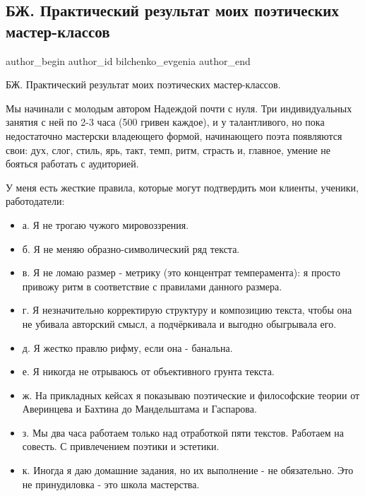  
 
 
 
 
 
\subsection{БЖ. Практический результат моих поэтических мастер-классов}
\label{sec:10_06_2021.fb.bilchenko_evgenia.1.masterklassy_rezultat}
\ifcmt
 author_begin
   author_id bilchenko_evgenia
 author_end
\fi

БЖ. Практический результат моих поэтических мастер-классов.

Мы начинали с молодым автором Надеждой почти с нуля. Три индивидуальных занятия
с ней по 2-3 часа (500 гривен каждое), и у талантливого, но пока недостаточно
мастерски владеющего формой, начинающего поэта появляются свои: дух, слог,
стиль, ярь, такт, темп, ритм, страсть и, главное, умение не бояться работать с
аудиторией. 

У меня есть жесткие правила, которые могут подтвердить мои клиенты, ученики, работодатели: 

\begin{itemize}
  \item а. Я не трогаю чужого мировоззрения. 
  \item б. Я не меняю образно-символический ряд текста. 
  \item в. Я не ломаю размер - метрику (это концентрат темперамента): я просто привожу ритм в соответствие с правилами данного размера. 
  \item г. Я незначительно корректирую структуру и композицию текста, чтобы она не убивала авторский смысл, а подчёркивала и выгодно обыгрывала его. 
  \item д. Я жестко правлю рифму, если она - банальна. 
  \item е. Я никогда не отрываюсь от объективного грунта текста. 
  \item ж. На прикладных кейсах я показываю поэтические и философские теории от Аверинцева и Бахтина до Мандельштама и Гаспарова. 
  \item з. Мы два часа работаем только над отработкой пяти текстов. Работаем на совесть. С привлечением поэтики и эстетики.
  \item к. Иногда я даю домашние задания, но их выполнение - не обязательно. Это не принудиловка - это школа мастерства. 
\end{itemize}

